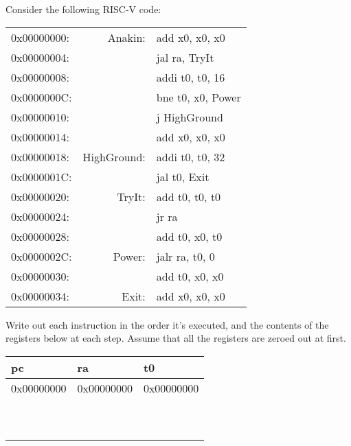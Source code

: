 \begin{blocksection}
\question 
Consider the following RISC-V code:

\begin{tabular}{l r l}
0x00000000:		&Anakin:	&add x0, x0, x0 \\
0x00000004:		&			&jal ra, TryIt \\
0x00000008:		&			&addi t0, t0, 16 \\
0x0000000C:		&			&bne t0, x0, Power \\
0x00000010:		&			&j HighGround \\
0x00000014:		&			&add x0, x0, x0 \\
0x00000018:		&HighGround:	&addi t0, t0, 32 \\
0x0000001C:		&			&jal t0, Exit \\
0x00000020:		&TryIt:		&add t0, t0, t0 \\
0x00000024:		&			&jr ra \\
0x00000028:		&			&add t0, x0, t0 \\
0x0000002C:		&Power:		&jalr ra, t0, 0 \\
0x00000030:		&			&add t0, x0, x0 \\
0x00000034:		&Exit:		&add x0, x0, x0 \\
\end{tabular}

Write out each instruction in the order it's executed, and the contents of the registers below at each step. Assume that all the registers are zeroed out at first.

\begin{center}
\begin{tabular}{ |l|l|l| } 
 \hline
 pc & ra & t0 \\ 
 \hline
 0x00000000 & 0x00000000 & 0x00000000 \\
 \hline
 & & \\
 \hline 
 & & \\
 \hline
 & & \\
 \hline 
 & & \\
 \hline
 & & \\
 \hline
 & & \\
 \hline
 & & \\
 \hline
 & & \\
 \hline
 & & \\
 \hline
 & & \\
 \hline
\end{tabular}
\end{center}
\end{blocksection}


